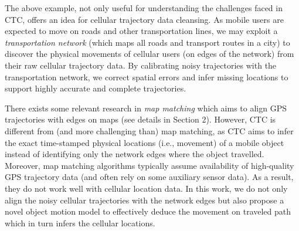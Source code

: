 \documentclass{vldb}
\begin{document}
	The above example, not only useful for understanding the challenges faced in CTC, offers an idea for cellular trajectory data cleansing. As mobile users are expected to move on roads and other transportation lines, we may exploit a {\em transportation network} (which maps all roads and transport routes in a city) to discover the physical movements of cellular users (on edges of the network) from their raw cellular trajectory data. By calibrating noisy trajectories with the transportation network, we correct spatial errors and infer missing locations to support highly accurate and complete trajectories. 
	
	There exists some relevant research in {\em map matching} which aims to align GPS trajectories with edges on maps (see details in Section 2). However, CTC is different from (and more challenging than) map matching, as CTC aims to infer the exact time-stamped physical locations (i.e., movement) of a mobile object instead of identifying only the network edges where the object travelled. Moreover, map matching algorithms typically assume availability of high-quality GPS trajectory data (and often rely on some auxiliary sensor data). As a result, they do not work well with cellular location data. In this work, we do not only align the noisy cellular trajectories with the network edges but also propose a novel object motion model to effectively deduce the movement on traveled path which in turn infers the cellular locations. 
	
	
\end{document}
